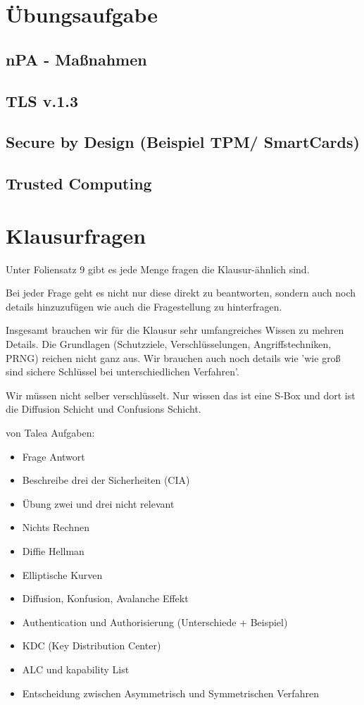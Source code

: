 \documentclass[a4paper]{article}
\begin{document}
\section{Übungsaufgabe}

\subsection{nPA - Maßnahmen}

\subsection{TLS v.1.3}

\subsection{Secure by Design (Beispiel TPM/ SmartCards)}

\subsection{Trusted Computing}


\section{Klausurfragen}

Unter Foliensatz 9 gibt es jede Menge fragen die Klausur-ähnlich sind. 

Bei jeder Frage geht es nicht nur diese direkt zu beantworten, sondern auch noch details hinzuzufügen wie auch die Fragestellung zu hinterfragen.

Insgesamt brauchen wir für die Klausur sehr umfangreiches Wissen zu mehren Details. Die Grundlagen (Schutzziele, Verschlüsselungen, Angriffstechniken, PRNG) reichen nicht ganz aus. Wir brauchen auch noch details wie 'wie groß sind sichere Schlüssel bei unterschiedlichen Verfahren'.

Wir müssen nicht selber verschlüsselt. Nur wissen das ist eine S-Box und dort ist die Diffusion Schicht und Confusions Schicht.


von Talea Aufgaben:

\begin{itemize}
    \item Frage Antwort
    \item Beschreibe drei der Sicherheiten (CIA)
    \item Übung zwei und drei nicht relevant
    \item Nichts Rechnen
    \item Diffie Hellman
    \item Elliptische Kurven
    \item Diffusion, Konfusion, Avalanche Effekt
    \item Authentication und Authorisierung (Unterschiede + Beispiel)
    \item KDC (Key Distribution Center)
    \item ALC und kapability List
    \item Entscheidung zwischen Asymmetrisch und Symmetrischen Verfahren
\end{itemize}
\end{document}
